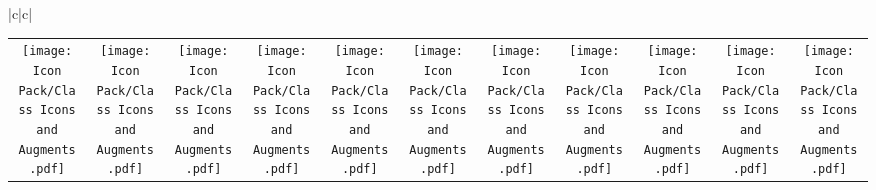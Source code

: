 \documentclass[13ex]{article}
\begin{document}
\begin{landscape}
\begin{center}
\begin{tabular}{|c|c|}
\begin{tabular}{c c c c c c c c c c c}
                \rule{0pt}{12pt}\texttt{[image: Icon Pack/Class Icons and Augments.pdf]}\underline{\hspace{1.25em}}  & \texttt{[image: Icon Pack/Class Icons and Augments.pdf]}\underline{\hspace{1.25em}}  & \texttt{[image: Icon Pack/Class Icons and Augments.pdf]}\underline{\hspace{1.25em}}  & \texttt{[image: Icon Pack/Class Icons and Augments.pdf]}\underline{\hspace{1.25em}}  & \texttt{[image: Icon Pack/Class Icons and Augments.pdf]}\underline{\hspace{1.25em}}  & \texttt{[image: Icon Pack/Class Icons and Augments.pdf]}\underline{\hspace{1.25em}}  & \texttt{[image: Icon Pack/Class Icons and Augments.pdf]}\underline{\hspace{1.25em}} & \texttt{[image: Icon Pack/Class Icons and Augments.pdf]}\underline{\hspace{1.25em}} & \texttt{[image: Icon Pack/Class Icons and Augments.pdf]}\underline{\hspace{1.25em}} & \texttt{[image: Icon Pack/Class Icons and Augments.pdf]}\underline{\hspace{1.25em}} & \texttt{[image: Icon Pack/Class Icons and Augments.pdf]}\underline{\hspace{1.25em}} \\

\end{tabular}
\end{tabular}
\end{center}
\end{landscape}
\end{document}
